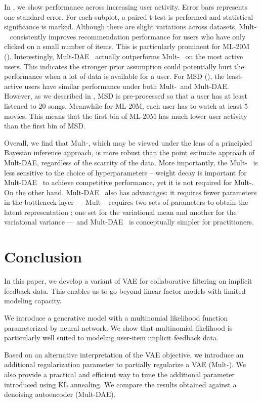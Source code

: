 \documentclass[sigconf]{acmart}
\newcommand{\mvae}{{\small Mult-}}
\newcommand{\mdae}{{\small Mult-}\gls{DAE}}
\begin{document}
In , we show performance across increasing user activity. Error bars represents one standard error. For each subplot, a paired t-test is performed and statistical significance is marked. Although there are slight variations across
datasets, \mvae~ consistently improves recommendation performance for users who have only clicked on a small number of items. This is particularly prominent for ML-20M (). Interestingly, \mdae~ actually outperforms \mvae~ on the most active users. This indicates the stronger prior assumption could 
potentially hurt the performance when a lot of data is available for a user. 
For MSD (), the least-active users have similar performance under both \mvae~and \mdae. However, as we described in , MSD is pre-processed so that a user has at least listened to 20 songs. Meanwhile for ML-20M, each user has to watch at least 5 movies. This means that the first bin of ML-20M has much lower user activity than the first bin of MSD.  

Overall, we find that \mvae, which may be viewed under the lens of a principled Bayesian inference approach, is more robust than the point estimate approach of \mdae, regardless of the scarcity of the data. More importantly, the \mvae~ is less sensitive to the choice of hyperparameters -- weight decay is important for \mdae~ to achieve competitive performance, yet it is not required for \mvae.
On the other hand, \mdae~ also has advantages: it requires fewer parameters in the bottleneck layer --- \mvae~ requires two sets of parameters to obtain the latent representation : one set for the variational mean  and another for the variational variance  --- and \mdae~ is conceptually simpler for practitioners. 
 
\section{Conclusion}

In this paper, we develop a variant of \gls{VAE} for collaborative filtering on implicit feedback data. This enables us to go beyond linear factor models with limited modeling capacity. 

We introduce a generative model with a multinomial likelihood function parameterized by neural network. We show that multinomial likelihood is particularly well suited to modeling user-item implicit feedback data. 

Based on an alternative interpretation of the \gls{VAE} objective, we introduce an additional regularization parameter to partially regularize a \gls{VAE} (\mvae). We also provide a practical and efficient way to tune the additional parameter introduced using KL annealing. We compare the results obtained against a denoising autoencoder (\mdae). 
\end{document}
